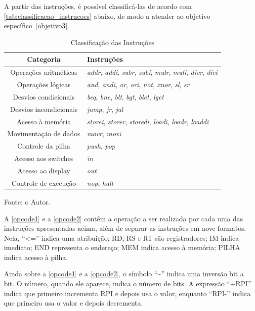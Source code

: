 \documentclass[
	12pt,				%
	oneside,
	a4paper,			%
	english,			%
	french,				%
	spanish,			%
	brazil,				%
	]{abntex2}
\begin{document}
A partir das instruções, é possível classificá-las de acordo com \autoref{tab:classificacao_instrucoes} abaixo, de modo a atender ao objetivo específico~\ref{objetivo3}.

\setlength{\tabcolsep}{10pt} %
\begin{table}[H]
\centering
\caption{Classificação das Instruções}
\label{tab:classificacao_instrucoes}
\begin{tabular}{|c|l|}
\hline
\textbf{Categoria} & \textbf{Instruções} \\
\hline
Operações aritméticas & \textit{addr}, \textit{addi}, \textit{subr}, \textit{subi}, \textit{mulr}, \textit{muli}, \textit{divr}, \textit{divi} \\
\hline
Operações lógicas & \textit{and}, \textit{andi}, \textit{or}, \textit{ori}, \textit{not}, \textit{xnor}, \textit{sl}, \textit{sr} \\
\hline
Desvios condicionais & \textit{beq}, \textit{bne}, \textit{blt}, \textit{bgt}, \textit{blet}, \textit{lget} \\
\hline
Desvios incondicionais & \textit{jump}, \textit{jr}, \textit{jal} \\
\hline
Acesso à memória & \textit{storei}, \textit{storer}, \textit{storedi}, \textit{loadi}, \textit{loadr}, \textit{loaddi} \\
\hline
Movimentação de dados & \textit{movr}, \textit{movi} \\
\hline
Controle da pilha & \textit{push}, \textit{pop} \\
\hline
Acesso aos switches & \textit{in} \\
\hline
Acesso ao display & \textit{out} \\
\hline
Controle de execução & \textit{nop}, \textit{halt} \\
\hline
\end{tabular}
\vspace{-0.5em}
\begin{center}
Fonte: o Autor.
\end{center}
\end{table}


A \autoref{opcode1} e a \autoref{opcode2} contêm a operação a ser realizada por cada uma das instruções apresentadas acima, além de separar as instruções em nove formatos. Nela, ``<='' indica uma atribuição; RD, RS e RT são registradores; IM indica imediato; END representa o endereço; MEM indica acesso à memória; PILHA indica acesso à pilha. 

Ainda sobre a \autoref{opcode1} e a \autoref{opcode2}, o símbolo ``\textasciitilde'' indica uma inversão bit a bit. O número, quando ele aparece, indica o número de bits. A expressão ``+RPI'' indica que primeiro incrementa RPI e depois usa o valor, enquanto ``RPI-'' indica que primeiro usa o valor e depois decrementa.
\end{document}
